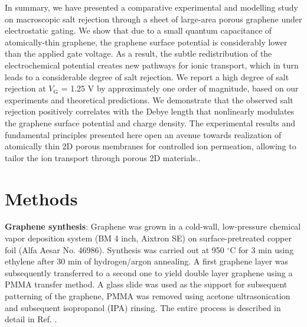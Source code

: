 \documentclass[journal=nalefd,email=true, hyperref=true, keywords=false]{achemso}
\begin{document}
In summary, we have presented a comparative experimental and modelling
study on macroscopic salt rejection through a sheet of large-area
porous graphene under electrostatic gating. We show that due to a
small quantum capacitance of atomically-thin graphene, the graphene
surface potential is considerably lower than the applied gate
voltage. As a result, the subtle redistribution of the electrochemical
potential creates new pathways for ionic transport, which in turn
leads to a considerable degree of salt rejection. We report a high
degree of salt rejection at $V_{\mathrm{G}}$ = 1.25 V by approximately
one order of magnitude, based on our experiments and theoretical
predictions. We demonstrate that the observed salt
rejection positively correlates with the Debye length that nonlinearly
modulates the graphene surface potential and charge density. The
experimental results and fundamental principles presented here open an
avenue towards realization of atomically thin 2D porous membranes for
{ controlled ion permeation, allowing to tailor the ion transport through porous 2D materials.}.

\section{Methods}
\label{sec:methods}

\textbf{Graphene synthesis}: Graphene was grown in a cold-wall,
low-pressure chemical vapor deposition system (BM 4 inch, Aixtron SE)
on surface-pretreated copper foil (Alfa Aesar No. 46986). Synthesis was
carried out at 950 $^{\circ}$C for 3 min using ethylene after 30 min of
hydrogen/argon annealing. A first graphene layer was subsequently
transferred to a second one to yield double layer graphene using a
PMMA transfer method. A glass slide was used as the support for
subsequent patterning of the graphene, PMMA was removed using acetone
ultrasonication and subsequent isopropanol (IPA) rinsing. The entire
process is described in detail in Ref. .
\end{document}
